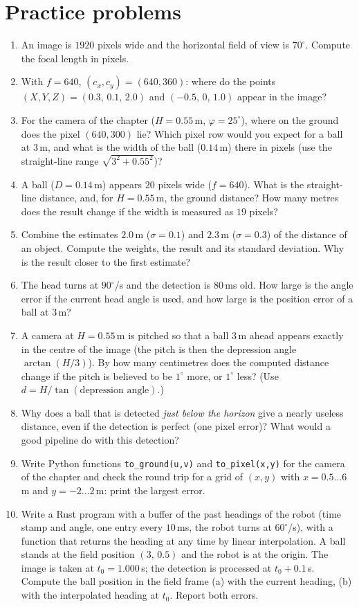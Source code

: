 \section*{Practice problems}
\begin{enumerate}[label=\textbf{\thechapter.\arabic*}]
  \item An image is $1920$ pixels wide and the horizontal field of view is $70^{\circ}$. Compute the focal length in pixels.
  \item With $f=640$, $(c_x,c_y)=(640,360)$: where do the points $(X,Y,Z)=(0.3,\,0.1,\,2.0)$ and $(-0.5,\,0,\,1.0)$ appear in the image?
  \item For the camera of the chapter ($H=0.55$\,m, $\varphi=25^{\circ}$), where on the ground does the pixel $(640,300)$ lie? Which pixel row would you expect for a ball at $3$\,m, and what is the width of the ball ($0.14$\,m) there in pixels (use the straight-line range $\sqrt{3^2+0.55^2}$)?
  \item A ball ($D=0.14$\,m) appears $20$ pixels wide ($f=640$). What is the straight-line distance, and, for $H=0.55$\,m, the ground distance? How many metres does the result change if the width is measured as $19$ pixels?
  \item Combine the estimates $2.0$\,m ($\sigma=0.1$) and $2.3$\,m ($\sigma=0.3$) of the distance of an object. Compute the weights, the result and its standard deviation. Why is the result closer to the first estimate?
  \item The head turns at $90^{\circ}$/s and the detection is $80$\,ms old. How large is the angle error if the current head angle is used, and how large is the position error of a ball at $3$\,m?
  \item A camera at $H=0.55$\,m is pitched so that a ball $3$\,m ahead appears exactly in the centre of the image (the pitch is then the depression angle $\arctan(H/3)$). By how many centimetres does the computed distance change if the pitch is believed to be $1^{\circ}$ more, or $1^{\circ}$ less? (Use $d=H/\tan(\text{depression angle})$.)
  \item Why does a ball that is detected \emph{just below the horizon} give a nearly useless distance, even if the detection is perfect (one pixel error)? What would a good pipeline do with this detection?
  \item Write Python functions \verb!to_ground(u,v)! and \verb!to_pixel(x,y)! for the camera of the chapter and check the round trip for a grid of $(x,y)$ with $x=0.5\dots6$\,m and $y=-2\dots2$\,m: print the largest error.
  \item[\textbf{\thechapter.10}$\star$] Write a Rust program with a buffer of the past headings of the robot (time stamp and angle, one entry every $10$\,ms, the robot turns at $60^{\circ}$/s), with a function that returns the heading at any time by linear interpolation. A ball stands at the field position $(3,\,0.5)$ and the robot is at the origin. The image is taken at $t_0=1.000$\,s; the detection is processed at $t_0+0.1$\,s. Compute the ball position in the field frame (a) with the current heading, (b) with the interpolated heading at $t_0$. Report both errors.
\end{enumerate}

